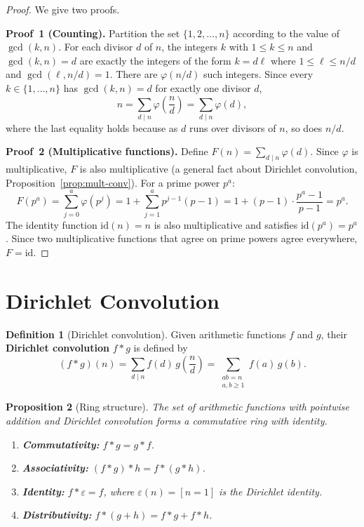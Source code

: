 \documentclass[12pt,a4paper,openany]{book}
\theoremstyle{definition}
\newtheorem{definition}{Definition}[chapter]
\theoremstyle{plain}
\newtheorem{proposition}[definition]{Proposition}
\theoremstyle{remark}
\begin{document}
\begin{proof}
We give two proofs.

\textbf{Proof~1 (Counting).}
Partition the set $\{1, 2, \ldots, n\}$ according to the value of
$\gcd(k, n)$.  For each divisor $d$ of $n$, the integers $k$ with
$1 \le k \le n$ and $\gcd(k,n) = d$ are exactly the integers of the form
$k = d\ell$ where $1 \le \ell \le n/d$ and $\gcd(\ell, n/d) = 1$.
There are $\varphi(n/d)$ such integers.  Since every $k \in \{1,\ldots,n\}$
has $\gcd(k,n) = d$ for exactly one divisor $d$,
\[
  n = \sum_{d \mid n} \varphi\!\left(\frac{n}{d}\right)
    = \sum_{d \mid n} \varphi(d),
\]
where the last equality holds because as $d$ runs over divisors of $n$,
so does $n/d$.

\medskip
\textbf{Proof~2 (Multiplicative functions).}
Define $F(n) = \sum_{d\mid n}\varphi(d)$.  Since $\varphi$ is multiplicative,
$F$ is also multiplicative (a general fact about Dirichlet convolution,
Proposition~\ref{prop:mult-conv}).
For a prime power $p^a$:
\[
  F(p^a) = \sum_{j=0}^{a}\varphi(p^j)
         = 1 + \sum_{j=1}^{a} p^{j-1}(p-1)
         = 1 + (p-1)\cdot\frac{p^a - 1}{p-1}
         = p^a.
\]
The identity function $\mathrm{id}(n) = n$ is also multiplicative and
satisfies $\mathrm{id}(p^a)=p^a$.  Since two multiplicative functions that
agree on prime powers agree everywhere, $F = \mathrm{id}$.
\end{proof}

\section{Dirichlet Convolution}\label{sec:dirichlet-conv}

\begin{definition}[Dirichlet convolution]\label{def:dirichlet-conv}
Given arithmetic functions $f$ and $g$, their \textbf{Dirichlet convolution}
$f \ast g$ is defined by
\[
  (f \ast g)(n) = \sum_{d \mid n} f(d)\,g\!\left(\frac{n}{d}\right)
               = \sum_{\substack{ab = n \\ a,b \ge 1}} f(a)\,g(b).
\]
\end{definition}

\begin{proposition}[Ring structure]\label{prop:conv-ring}
The set of arithmetic functions with pointwise addition and Dirichlet
convolution forms a commutative ring with identity.
\begin{enumerate}[label=(\roman*)]
  \item \textbf{Commutativity:} $f \ast g = g \ast f$.
  \item \textbf{Associativity:} $(f \ast g) \ast h = f \ast (g \ast h)$.
  \item \textbf{Identity:} $f \ast \varepsilon = f$, where
        $\varepsilon(n) = [n=1]$ is the Dirichlet identity.
  \item \textbf{Distributivity:} $f \ast (g + h) = f\ast g + f\ast h$.
\end{enumerate}
\end{proposition}
\end{document}
